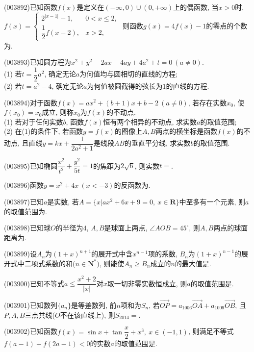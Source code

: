 \item (003892)已知函数$f(x)$是定义在$(-\infty,0)\cup (0,+\infty)$上的偶函数, 当$x>0$时, $f(x)=\begin{cases}
2^{|x-1|}-1, & 0<x\le 2,\\\dfrac 12f(x-2), & x>2,
\end{cases}$ 则函数$g(x)=4f(x)-1$的零点的个数为.
\item (003893)已知圆方程为$x^2+y^2-2ax-4ay+4a^2+t=0 \ (a\ne 0)$.\\
(1) 若$t=\dfrac 12 a^2$, 确定无论$a$为何值均与圆相切的直线的方程;\\
(2) 若$t=a^2-4$, 确定无论$a$为何值被圆截得的弦长为$1$的直线的方程.
\item (003894)对于函数$f(x)=ax^2+(b+1)x+b-2 \ (a\ne 0)$, 若存在实数$x_0$, 使$f(x_0)=x_0$成立, 则称$x_0$为$f(x)$的不动点.\\
(1) 若对于任何实数$b$, 函数$f(x)$恒有两个相异的不动点, 求实数$a$的取值范围;\\
(2) 在(1)的条件下, 若函数$y=f(x)$的图像上$A,B$两点的横坐标是函数$f(x)$的不动点, 且直线$y=kx+\dfrac{1}{2a^2+1}$是线段$AB$的垂直平分线, 求实数$b$的取值范围.
\item (003895)已知椭圆$\dfrac{x^2}{t^2}+\dfrac{y^2}{5t}=1$的焦距为$2\sqrt{6}$, 则实数$t=$.
\item (003896)函数$y=x^2+4x \ (x<-3)$的反函数为.
\item (003897)已知$a$是实数, 若$A=\{x|ax^2+6x+9=0, \ x\in \mathbf{R}\}$中至多有一个元素, 则$a$的取值范围为.
\item (003898)已知球$O$的半径为$4$, $A,B$是球面上两点, $\angle AOB=45^\circ$, 则$A,B$两点的球面距离为.
\item (003899)设$A_n$为$(1+x)^{n+1}$的展开式中含$x^{n-1}$项的系数, $B_n$为$(1+x)^{n-1}$的展开式中二项式系数的和($n\in \mathbf{N}^*$), 则能使$A_n\ge B_n$成立的$n$的最大值是.
\item (003900)已知不等式$a\le \dfrac{x^2+2}{|x|}$对$x$取一切非零实数恒成立, 则$a$的取值范围是.
\item (003901)已知数列$\{a_n\}$是等差数列, 前$n$项和为$S_n$, 若$\overrightarrow{OP}=a_{1006}\overrightarrow{OA}+a_{1009}\overrightarrow{OB}$, 且$P,A,B$三点共线($O$不在该直线上), 则$S_{2014}=$.
\item (003902)已知函数$f(x)=\sin x+\tan \dfrac x2+x^3, \ x\in (-1,1)$, 则满足不等式$f(a-1)+f(2a-1)<0$的实数$a$的取值范围是.
